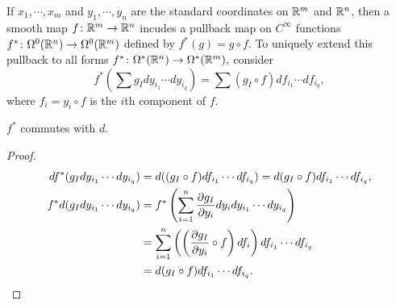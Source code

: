 If $x_1,\cdots ,x_m$ and $y_1,\cdots ,y_n $ are the standard coordinates on $\mathbb{R}^m$ and $\mathbb{R}^n $, then a smooth map $f \colon \mathbb{R}^m \to \mathbb{R}^n $ incudes a pullback map on $C^{\infty}$ functions $f^* \colon \Omega^0(\mathbb{R}^n ) \to \Omega^0(\mathbb{R}^m)$ defined by $f^*(g)=g \circ f$. To uniquely extend this pullback to all forms $f^* \colon \Omega^* (\mathbb{R}^n ) \to \Omega^*(\mathbb{R}^m),$ consider \[
    f^*\left(\sum g_I dy_{i_1}\cdots dy_{i_q}\right)=\sum (g_I \circ f)df_{i_1}\cdots df_{i_q}, 
\] where $f_i =y_i  \circ f$ is the $i$th component of $f$.
\begin{prop}
   $f^*$ commutes with $d$. 
\end{prop}
\begin{proof}
    \begin{align*}
        df^*(g_I dy_{i_1}\cdots dy_{i_q})&=d((g_I \circ f) df_{i_1}\cdots df_{i_q})=d(g_I \circ f)df_{i_1}\cdots df_{i_q},\\
        f^*d(g_I dy _{i_1}\cdots dy_{i_q})&=f^*\left( \sum_{i=1}^{n} \frac{\partial g_I}{\partial y_i }dy_i dy_{i_1}\cdots dy_{i_q} \right) \\
                                          &=\sum_{i=1}^{n} \left( \left( \frac{\partial g_I}{\partial y_i }\circ f \right) df_i  \right) df_{i_1}\cdots df_{i_q}\\
                                          &=d(g_I \circ f)df_{i_1}\cdots df_{i_q}.\qedhere
    \end{align*}
\end{proof}

